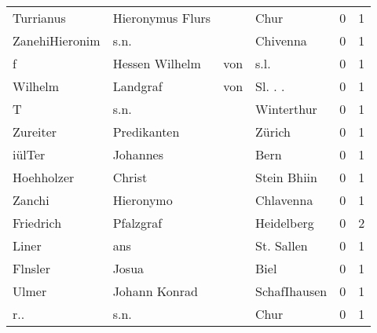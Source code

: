 \begin{center}
\begin{tiny}
\begin{longtabu}{llllrr}
                Turrianus &                   Hieronymus Flurs &             &                                        Chur &          0 &         1 \\
           ZanehiHieronim &                               s.n. &             &                                    Chivenna &          0 &         1 \\
                        f &                     Hessen Wilhelm &         von &                                        s.l. &          0 &         1 \\
                  Wilhelm &                           Landgraf &         von &                                    Sl. . .  &          0 &         1 \\
                        T &                               s.n. &             &                                  Winterthur &          0 &         1 \\
                 Zureiter &                        Predikanten &             &                                      Zürich &          0 &         1 \\
                   iülTer &                           Johannes &             &                                        Bern &          0 &         1 \\
               Hoehholzer &                             Christ &             &                                 Stein Bhiin &          0 &         1 \\
                   Zanchi &                          Hieronymo &             &                                   Chlavenna &          0 &         1 \\
                Friedrich &                          Pfalzgraf &             &                                  Heidelberg &          0 &         2 \\
                    Liner &                                ans &             &                                  St. Sallen &          0 &         1 \\
                  Flnsler &                              Josua &             &                                        Biel &          0 &         1 \\
                    Ulmer &                      Johann Konrad &             &                                SchafIhausen &          0 &         1 \\
                      r.. &                               s.n. &             &                                        Chur &          0 &         1 \\

\end{longtabu}
\end{tiny}
\end{center}
